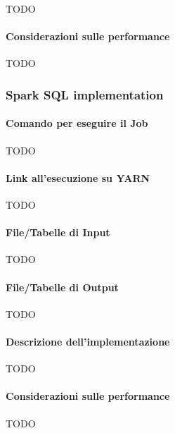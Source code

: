   TODO

  \paragraph{Considerazioni sulle performance}\label{par:job2:mapreduce:performance}

  TODO

  \subsubsection{Spark SQL implementation}\label{subsub:job2:spark}

  \paragraph{Comando per eseguire il Job}\label{par:job2:spark:cmd}

  TODO

  \paragraph{Link all’esecuzione su YARN}\label{par:job2:spark:yarn}

  TODO

  \paragraph{File/Tabelle di Input}\label{par:job2:spark:input}

  TODO

  \paragraph{File/Tabelle di Output}\label{par:job2:spark:output}

  TODO

  \paragraph{Descrizione dell’implementazione}\label{par:job2:spark:implementation}

  TODO

  \paragraph{Considerazioni sulle performance}\label{par:job2:spark:performance}

  TODO
